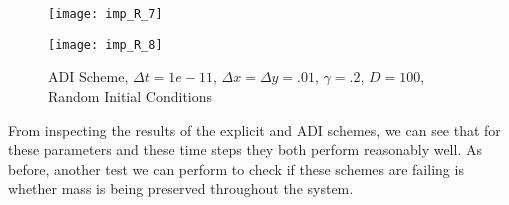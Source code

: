 \documentclass[]{article}
\theoremstyle{definition}
\numberwithin{equation}{section}
\numberwithin{equation}{section}
\begin{document}
\begin{figure}[H]
	\begin{minipage}{0.5\textwidth}
		\hspace*{-2cm}
		\texttt{[image: imp\_R\_7]}
	\end{minipage}
	\begin{minipage}{0.5\textwidth}
		\texttt{[image: imp\_R\_8]}
	\end{minipage}
	\caption{ADI Scheme, $\Delta t = 1e-11$, $\Delta x = \Delta y = .01$, $\gamma = .2$, $D = 100$, Random Initial Conditions}
\end{figure}
From inspecting the results of the explicit and ADI schemes, we can see that for these parameters and these time steps they both perform reasonably well. As before, another test we can perform to check if these schemes are failing is whether mass is being preserved throughout the system.
\end{document}

